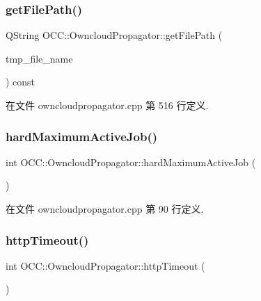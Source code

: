 \subsubsection{\texorpdfstring{get\+File\+Path()}{getFilePath()}}
{\footnotesize\ttfamily Q\+String O\+C\+C\+::\+Owncloud\+Propagator\+::get\+File\+Path (\begin{DoxyParamCaption}\item[{const Q\+String \&}]{tmp\+\_\+file\+\_\+name }\end{DoxyParamCaption}) const}



在文件 owncloudpropagator.\+cpp 第 516 行定义.

\mbox{\label{class_o_c_c_1_1_owncloud_propagator_a584e31a3eaf4f38b49a50dc06ac17d1e}} 
\subsubsection{\texorpdfstring{hard\+Maximum\+Active\+Job()}{hardMaximumActiveJob()}}
{\footnotesize\ttfamily int O\+C\+C\+::\+Owncloud\+Propagator\+::hard\+Maximum\+Active\+Job (\begin{DoxyParamCaption}{ }\end{DoxyParamCaption})}



在文件 owncloudpropagator.\+cpp 第 90 行定义.

\mbox{\label{class_o_c_c_1_1_owncloud_propagator_a3e27712c81f88179dcdcd94e1a8e4431}} 
\subsubsection{\texorpdfstring{http\+Timeout()}{httpTimeout()}}
{\footnotesize\ttfamily int O\+C\+C\+::\+Owncloud\+Propagator\+::http\+Timeout (\begin{DoxyParamCaption}{ }\end{DoxyParamCaption})\hspace{0.3cm}{\ttfamily [static]}}



